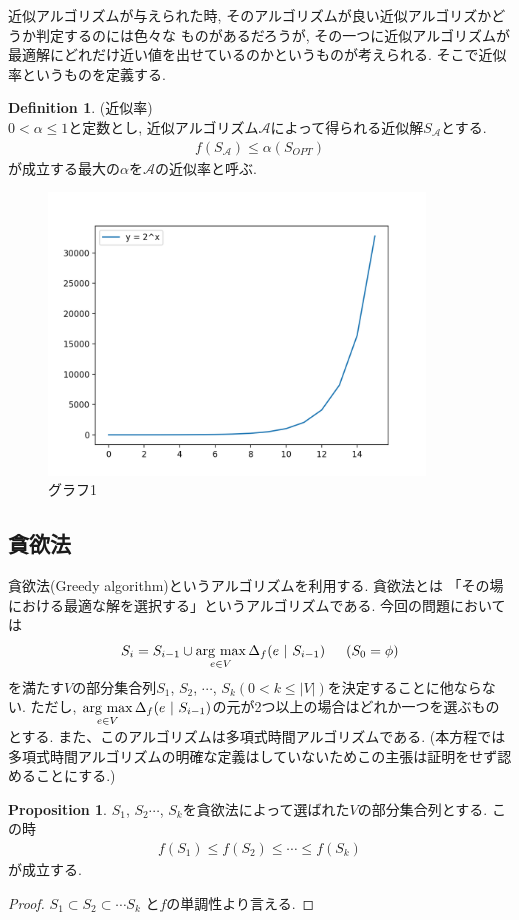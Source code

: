 \documentclass[11pt, a4paper, dvipdfmx]{jsarticle}
\theoremstyle{definition}
\newtheorem{Definition+}[Axiom+]{Definition}
\newtheorem{Proposition+}[Axiom+]{Proposition}
\begin{document}
近似アルゴリズムが与えられた時, そのアルゴリズムが良い近似アルゴリズかどうか判定するのには色々な
ものがあるだろうが, その一つに近似アルゴリズムが最適解にどれだけ近い値を出せているのかというものが考えられる. そこで近似率というものを定義する.
\begin{Definition+}(近似率)\\
    $ 0< \alpha \leq 1$と定数とし, 近似アルゴリズム$\mathcal{A}$によって得られる近似解$S_{\mathcal{A}}$とする. 
    \begin{align*}
        f(S_{\mathcal{A}})\leq \alpha(S_{OPT})
    \end{align*}
    が成立する最大の$\alpha$を$\mathcal{A}$の近似率と呼ぶ.
\end{Definition+}
\begin{figure}[h]
    \centering
    \includegraphics[width = 100mm]{Graph1_houtei.png}
    \caption{グラフ1}
\end{figure}
\subsection{貪欲法}
 貪欲法(Greedy algorithm)というアルゴリズムを利用する. 貪欲法とは
「その場における最適な解を選択する」というアルゴリズムである. 今回の問題においては
\begin{align*}
    S_{i} = S_{i - 1}\cup\mathop{\rm arg~max}\limits_{e\in V}\Delta_{f}(e~|~S_{i - 1})\hspace{15pt}(S_{0} = \phi)
\end{align*}
を満たす$V$の部分集合列$S_{1}$, $S_{2}$, $\cdots$, $S_{k}(0<k\leq |V|)$を決定することに他ならない. ただし, $\mathop{\rm arg~max}\limits_{e\in V}\Delta_{f}(e~|~S_{i - 1})$の元が2つ以上の場合はどれか一つを選ぶものとする. 
また、このアルゴリズムは多項式時間アルゴリズムである. (本方程では多項式時間アルゴリズムの明確な定義はしていないためこの主張は証明をせず認めることにする.) 
\begin{Proposition+}
$S_{1}$, $S_{2}$$\cdots$, $S_{k}$を貪欲法によって選ばれた$V$の部分集合列とする. この時
    \begin{align*}
        f(S_{1})\leq f(S_{2})\leq \cdots \leq f(S_{k})
    \end{align*}
    が成立する.
    \begin{proof}
        $S_{1}\subset S_{2}\subset \cdots S_{k}$ と$f$の単調性より言える.
    \end{proof}
\end{Proposition+}
\end{document}
